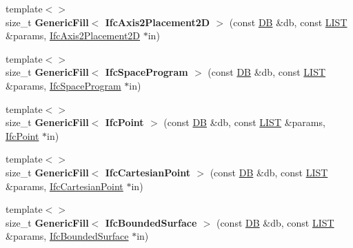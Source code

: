 \begin{DoxyCompactItemize}
\item 
\hypertarget{namespace_assimp_1_1_s_t_e_p_a3816d18823a59c763965b5f51bdd6848}{{\footnotesize template$<$$>$ }\\size\+\_\+t {\bfseries Generic\+Fill$<$ Ifc\+Axis2\+Placement2\+D $>$} (const \hyperlink{class_assimp_1_1_s_t_e_p_1_1_d_b}{D\+B} \&db, const \hyperlink{class_assimp_1_1_s_t_e_p_1_1_e_x_p_r_e_s_s_1_1_l_i_s_t}{L\+I\+S\+T} \&params, \hyperlink{struct_assimp_1_1_i_f_c_1_1_ifc_axis2_placement2_d}{Ifc\+Axis2\+Placement2\+D} $\ast$in)}\label{namespace_assimp_1_1_s_t_e_p_a3816d18823a59c763965b5f51bdd6848}

\item 
\hypertarget{namespace_assimp_1_1_s_t_e_p_a6cd3d9e457bef28f78f6b767dc39ece2}{{\footnotesize template$<$$>$ }\\size\+\_\+t {\bfseries Generic\+Fill$<$ Ifc\+Space\+Program $>$} (const \hyperlink{class_assimp_1_1_s_t_e_p_1_1_d_b}{D\+B} \&db, const \hyperlink{class_assimp_1_1_s_t_e_p_1_1_e_x_p_r_e_s_s_1_1_l_i_s_t}{L\+I\+S\+T} \&params, \hyperlink{struct_assimp_1_1_i_f_c_1_1_ifc_space_program}{Ifc\+Space\+Program} $\ast$in)}\label{namespace_assimp_1_1_s_t_e_p_a6cd3d9e457bef28f78f6b767dc39ece2}

\item 
\hypertarget{namespace_assimp_1_1_s_t_e_p_a419ae44522b30b4e574eed71dac86a1d}{{\footnotesize template$<$$>$ }\\size\+\_\+t {\bfseries Generic\+Fill$<$ Ifc\+Point $>$} (const \hyperlink{class_assimp_1_1_s_t_e_p_1_1_d_b}{D\+B} \&db, const \hyperlink{class_assimp_1_1_s_t_e_p_1_1_e_x_p_r_e_s_s_1_1_l_i_s_t}{L\+I\+S\+T} \&params, \hyperlink{struct_assimp_1_1_i_f_c_1_1_ifc_point}{Ifc\+Point} $\ast$in)}\label{namespace_assimp_1_1_s_t_e_p_a419ae44522b30b4e574eed71dac86a1d}

\item 
\hypertarget{namespace_assimp_1_1_s_t_e_p_accd6e8af08ca5eb00224a29f5f642202}{{\footnotesize template$<$$>$ }\\size\+\_\+t {\bfseries Generic\+Fill$<$ Ifc\+Cartesian\+Point $>$} (const \hyperlink{class_assimp_1_1_s_t_e_p_1_1_d_b}{D\+B} \&db, const \hyperlink{class_assimp_1_1_s_t_e_p_1_1_e_x_p_r_e_s_s_1_1_l_i_s_t}{L\+I\+S\+T} \&params, \hyperlink{struct_assimp_1_1_i_f_c_1_1_ifc_cartesian_point}{Ifc\+Cartesian\+Point} $\ast$in)}\label{namespace_assimp_1_1_s_t_e_p_accd6e8af08ca5eb00224a29f5f642202}

\item 
\hypertarget{namespace_assimp_1_1_s_t_e_p_a09dbe7a0544644c3d71032e8e322d80a}{{\footnotesize template$<$$>$ }\\size\+\_\+t {\bfseries Generic\+Fill$<$ Ifc\+Bounded\+Surface $>$} (const \hyperlink{class_assimp_1_1_s_t_e_p_1_1_d_b}{D\+B} \&db, const \hyperlink{class_assimp_1_1_s_t_e_p_1_1_e_x_p_r_e_s_s_1_1_l_i_s_t}{L\+I\+S\+T} \&params, \hyperlink{struct_assimp_1_1_i_f_c_1_1_ifc_bounded_surface}{Ifc\+Bounded\+Surface} $\ast$in)}\label{namespace_assimp_1_1_s_t_e_p_a09dbe7a0544644c3d71032e8e322d80a}


\end{DoxyCompactItemize}

